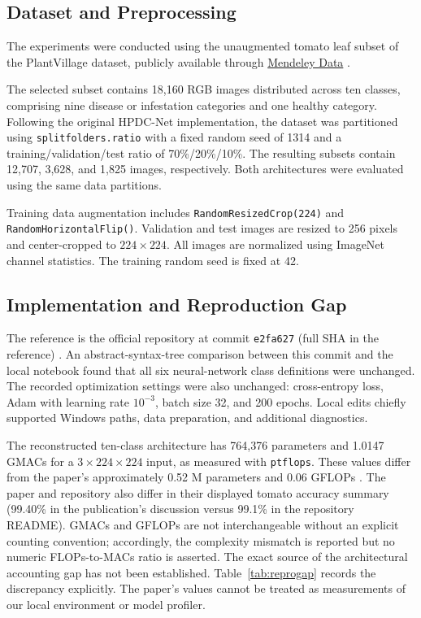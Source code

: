 \documentclass[conference,10pt]{IEEEtran}
\begin{document}
\subsection{Dataset and Preprocessing}

The experiments were conducted using the unaugmented
tomato leaf subset of the PlantVillage dataset, publicly
available through
\href{https://data.mendeley.com/datasets/tywbtsjrjv/1}
{Mendeley Data} \cite{mendeley2019}.

The selected subset contains 18,160 RGB images distributed
across ten classes, comprising nine disease or infestation
categories and one healthy category. Following the original
HPDC-Net implementation, the dataset was partitioned using
\texttt{splitfolders.ratio} with a fixed random seed of 1314
and a training/validation/test ratio of
70\%/20\%/10\%. The resulting subsets contain 12,707,
3,628, and 1,825 images, respectively. Both architectures
were evaluated using the same data partitions.

Training data augmentation includes
\texttt{RandomResizedCrop(224)} and
\texttt{RandomHorizontalFlip()}. Validation and test images
are resized to 256 pixels and center-cropped to
$224\times224$. All images are normalized using ImageNet
channel statistics. The training random seed is fixed at 42.
\subsection{Implementation and Reproduction Gap}
The reference is the official repository at commit \texttt{e2fa627} (full SHA in the reference) \cite{hpdcgithub}. An abstract-syntax-tree comparison between this commit and the local notebook found that all six neural-network class definitions were unchanged. The recorded optimization settings were also unchanged: cross-entropy loss, Adam with learning rate $10^{-3}$, batch size 32, and 200 epochs. Local edits chiefly supported Windows paths, data preparation, and additional diagnostics.

The reconstructed ten-class architecture has 764,376 parameters and 1.0147 GMACs for a $3\times224\times224$ input, as measured with \texttt{ptflops}. These values differ from the paper's approximately 0.52 M parameters and 0.06 GFLOPs \cite{asghar2025}. The paper and repository also differ in their displayed tomato accuracy summary (99.40\% in the publication's discussion versus 99.1\% in the repository README). GMACs and GFLOPs are not interchangeable without an explicit counting convention; accordingly, the complexity mismatch is reported but no numeric FLOPs-to-MACs ratio is asserted. The exact source of the architectural accounting gap has not been established. Table~\ref{tab:reprogap} records the discrepancy explicitly. The paper's values cannot be treated as measurements of our local environment or model profiler.
\end{document}
